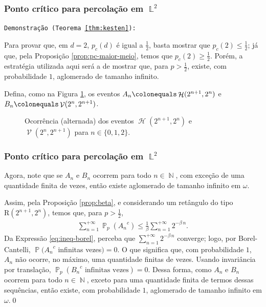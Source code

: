 \documentclass[9pt]{beamer}
\theoremstyle{definition} %
\DeclareMathOperator{\PX}{\mathbb{P}} %
\DeclareMathOperator{\NX}{\mathbb{N}} %
\DeclareMathOperator{\LX}{\mathbb{L}} %
\DeclareMathOperator{\HL}{\mathcal{H}} %
\DeclareMathOperator{\VL}{\mathcal{V}} %
\begin{document}
	\begin{frame}[t]
		\frametitle{Ponto crítico para percolação em $\LX^2$}
		\texttt{Demonstração (Teorema \ref{thm:kesten}):}
			
		Para provar que, em $d = 2$, $p_c(d)$ é igual a $\frac{1}{2}$, basta mostrar que $p_c(2) \leq \frac{1}{2}$; já que, pela Proposição \ref{prop:pc-maior-meio}, temos que $p_c(2) \geq \frac{1}{2}$. Porém, a estratégia utilizada aqui será a de mostrar que, para $p > \frac{1}{2}$, existe, com probabilidade $1$, aglomerado de tamanho \hspace{1pt}infinito.\pause
		
		Defina, como na Figura \ref{fig:caixas-iteradas}, os eventos $A_n \colonequals \HL(2^{n+1}, 2^n)$ e $B_n \colonequals \VL(2^n, 2^{n+1})$.
		
		\begin{figure}
			
			\vspace{-9pt}
			\caption{\justifying Ocorrência (alternada) dos eventos $\HL(2^{n+1}, 2^n)$ e $\VL(2^n, 2^{n+1})$ para $n \in \{0, 1, 2\}$.}
			\label{fig:caixas-iteradas}
		\end{figure}
	\end{frame}

	\begin{frame}[t]
	\frametitle{Ponto crítico para percolação em $\LX^2$}
		Agora, note que se $A_n$ e $B_n$ ocorrem para todo $n \in \NX$, com exceção de uma quantidade finita de vezes, então existe aglomerado de tamanho infinito em $\omega$.
		
		Assim, pela Proposição \ref{prop:beta}, e considerando um retângulo do tipo $\text{R}(2^{n+1}, 2^n)$, temos que, para $p > \frac{1}{2}$,
		\begin{align}\label{eq:ineq-borel}
		\sum_{n = 1}^{+\infty}\PX_p({A_n}^c) \leq \frac{1}{\beta} \sum_{n = 1}^{+\infty} 2^{-\beta\,n}.
		\end{align}\pause	
		Da Expressão \ref{eq:ineq-borel}, perceba que $\sum_{n=1}^{+\infty}2^{-\beta\,n}$ converge; logo, por Borel-Cantelli, $\PX({A_n}^c$ infinitas vezes$) = 0$. O que significa que, com probabilidade $1$, $A_n$ não ocorre, no máximo, uma quantidade finitas de vezes. Usando invariância por translação, $\PX_p({B_n}^c \text{ infinitas vezes}) = 0$. Dessa forma, como $A_n$ e $B_n$ ocorrem para todo $n \in \NX$, exceto para uma quantidade finita de termos dessas sequências, então existe, com probabilidade $1$, aglomerado de tamanho infinito em $\omega$.\hspace{\fill}\qed
	\end{frame}
\end{document}
